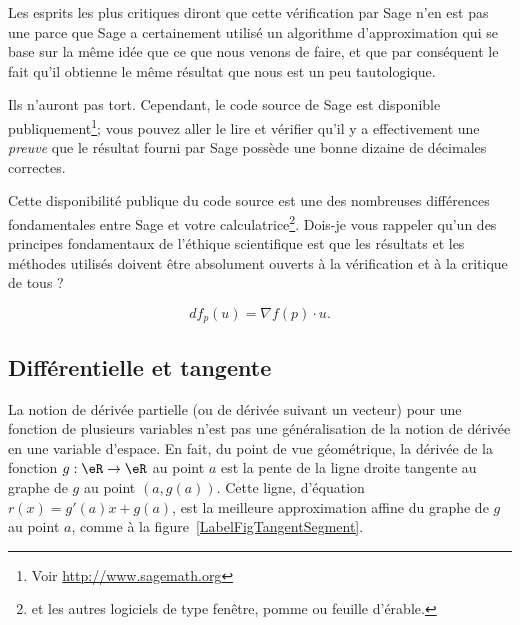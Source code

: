 \begin{remark}
	Les esprits les plus critiques diront que cette vérification par Sage n'en est pas une parce que Sage a certainement utilisé un algorithme d'approximation qui se base sur la même idée que ce que nous venons de faire, et que par conséquent le fait qu'il obtienne le même résultat que nous est un peu tautologique.

	Ils n'auront pas tort. Cependant, le code source de Sage est disponible publiquement\footnote{Voir \url{http://www.sagemath.org}}; vous pouvez aller le lire et vérifier qu'il y a effectivement une \emph{preuve} que le résultat fourni par Sage possède une bonne dizaine de décimales correctes.

	Cette disponibilité publique du code source est une des nombreuses différences fondamentales entre Sage et votre calculatrice\footnote{et les autres logiciels de type fenêtre, pomme ou feuille d'érable.}. Dois-je vous rappeler qu'un des principes fondamentaux de l'éthique scientifique est que les résultats et les méthodes utilisés doivent être absolument ouverts à la vérification et à la critique de tous ?
\end{remark}
\begin{equation}        \label{Eqdfpunfpdu}
	df_p(u)=\nabla f(p)\cdot u.
\end{equation}

\subsection{Différentielle et tangente}

La notion de dérivée partielle (ou de dérivée suivant un vecteur) pour une fonction de plusieurs variables n'est pas une  généralisation de la notion de dérivée en une variable d'espace. En fait, du point de vue géométrique, la dérivée de la fonction \( g:\eR\to\eR\) au point \( a\) est la pente de la ligne droite tangente au graphe de \( g\) au point \( (a, g(a))\). Cette ligne, d'équation \( r(x)=g'(a)x+g(a)\), est la meilleure approximation affine du graphe de \( g\) au point \( a\), comme à la figure~\ref{LabelFigTangentSegment}.
\newcommand{\CaptionFigTangentSegment}{Tangentes au graphe d'une fonction d'une variable}


